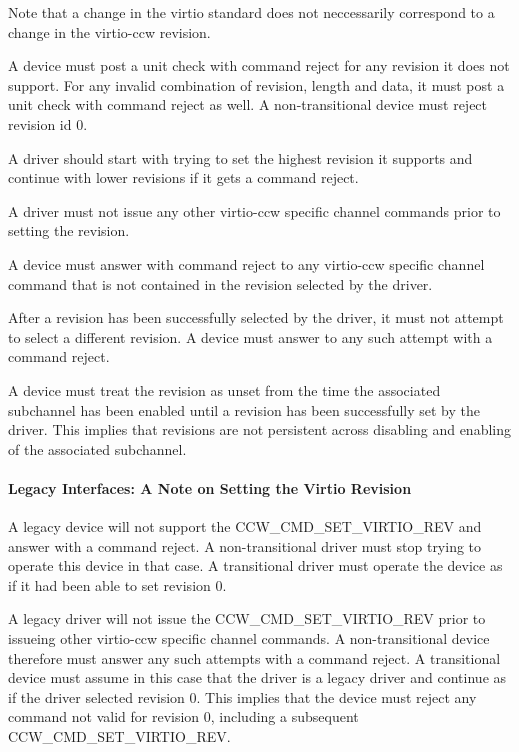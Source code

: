 Note that a change in the virtio standard does not neccessarily
correspond to a change in the virtio-ccw revision.

A device must post a unit check with command reject for any revision
it does not support. For any invalid combination of revision, length
and data, it must post a unit check with command reject as well. A
non-transitional device must reject revision id 0.

A driver should start with trying to set the highest revision it
supports and continue with lower revisions if it gets a command reject.

A driver must not issue any other virtio-ccw specific channel commands
prior to setting the revision.

A device must answer with command reject to any virtio-ccw specific
channel command that is not contained in the revision selected by the
driver.

After a revision has been successfully selected by the driver, it
must not attempt to select a different revision. A device must answer
to any such attempt with a command reject.

A device must treat the revision as unset from the time the associated
subchannel has been enabled until a revision has been successfully set
by the driver. This implies that revisions are not persistent across
disabling and enabling of the associated subchannel.

\paragraph{Legacy Interfaces: A Note on Setting the Virtio Revision}\label{sec:Virtio Transport Options / Virtio over channel I/O / Device Initialization / Setting the Virtio Revision / Legacy Interfaces: A Note on Setting the Virtio Revision}

A legacy device will not support the CCW_CMD_SET_VIRTIO_REV and answer
with a command reject. A non-transitional driver must stop trying to
operate this device in that case. A transitional driver must operate
the device as if it had been able to set revision 0.

A legacy driver will not issue the CCW_CMD_SET_VIRTIO_REV prior to
issueing other virtio-ccw specific channel commands. A non-transitional
device therefore must answer any such attempts with a command reject.
A transitional device must assume in this case that the driver is a
legacy driver and continue as if the driver selected revision 0. This
implies that the device must reject any command not valid for revision
0, including a subsequent CCW_CMD_SET_VIRTIO_REV.

